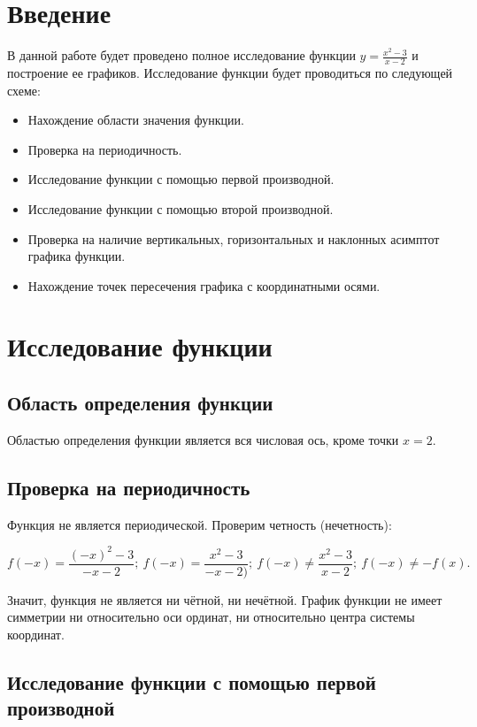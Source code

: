 \section*{Введение}

В данной работе будет проведено полное исследование функции $y = \frac{x^2-3}{x-2}$ и построение ее графиков. Исследование функции будет проводиться по следующей схеме:
\begin{itemize}
    \item Нахождение области значения функции.
    \item Проверка на периодичность.
    \item Исследование функции с помощью первой производной.
    \item Исследование функции с помощью второй производной.
    \item Проверка на наличие вертикальных, горизонтальных и наклонных асимптот графика функции.
    \item Нахождение точек пересечения графика с координатными осями.
\end{itemize}


\newpage
\section{Исследование функции}

\subsection{Область определения функции}

Областью определения функции является вся числовая ось, кроме точки $x = 2$.

\subsection{Проверка на периодичность}

Функция не является периодической. Проверим четность (нечетность):

\[f(-x) = \frac{(-x)^2-3}{-x-2} ;\ f(-x) = \frac{x^2-3}{-x-2)} ;\ f(-x) \neq \frac{x^2-3}{x-2} ;\ f(-x) \neq -f(x).\]

Значит, функция не является ни чётной, ни нечётной. График функции не
имеет симметрии ни относительно оси ординат, ни относительно центра
системы координат.

\subsection{Исследование функции с помощью первой производной}

